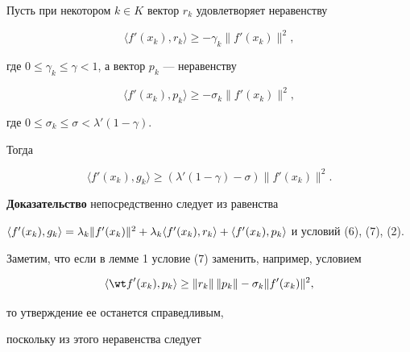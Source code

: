 \begin{lem}


Пусть при некотором $k\in K$ вектор $r_k$ удовлетворяет неравенству


\begin{equation}


\langle {{f}'(x_k),r_k} \rangle \ge -\gamma_k \|{{f}'(x_k)} \|^2,


\end{equation}


где $0\le \gamma_k\le \gamma <1$, а вектор $p_k$ --- неравенству


\begin{equation}


\langle {{f}'(x_k),p_k} \rangle \ge -\sigma_k \|{{f}'(x_k)} \|^2,


\end{equation}


где $0\le \sigma_k\le \sigma <{\lambda}'(1-\gamma)$.


Тогда


$$


\langle {{f}'(x_k),g_k} \rangle \ge


({\lambda}'(1-\gamma)-\sigma) \|{{f}'(x_k)} \|^2.


$$


\end{lem}





{\bf Доказательство} непосредственно следует из равенства


$\langle {{f}'(x_k),g_k} \rangle =


\lambda_k \|{{f}'(x_k)} \|^2+\linebreak


\lambda_k\langle {{f}'(x_k),r_k} \rangle +


\langle {{f}'(x_k),p_k} \rangle$ и условий (6), (7), (2).





Заметим, что если в лемме 1 условие (7) заменить, например, условием


$$


\langle {{\wt f}'(x_k),p_k} \rangle \ge \|{r_k} \|\,\|{p_k} \|-\sigma_k


\|{{f}'(x_k)} \|^2,


$$


то утверждение ее останется справедливым, 


поскольку из этого неравенства следует


